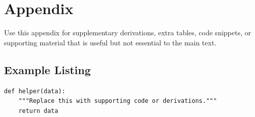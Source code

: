 \chapter{Appendix}

Use this appendix for supplementary derivations, extra tables, code snippets, or supporting material that is useful but not essential to the main text.

\section{Example Listing}

\begin{lstlisting}[caption={Template for supplementary code}, label={lst:appendix-template}]
def helper(data):
    """Replace this with supporting code or derivations."""
    return data
\end{lstlisting}
